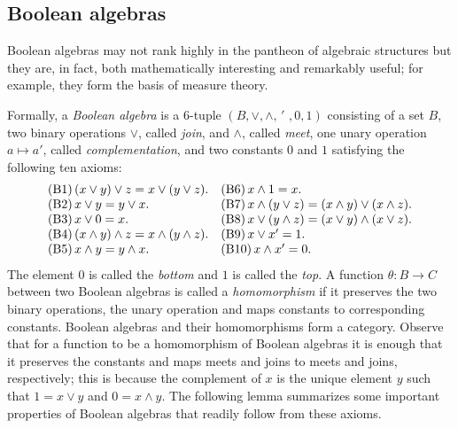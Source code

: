 \documentclass[a4paper]{amsart}
\begin{document}
\subsection{Boolean algebras}
Boolean algebras may not rank highly in the pantheon of algebraic structures but they are, in fact, both mathematically interesting and remarkably useful; for example, 
they form the basis of measure theory.

Formally, a {\em Boolean algebra} is a $6$-tuple 
$(B,\vee,\wedge, \,' \, \, , 0,1)$
consisting of a set $B$, two binary operations $\vee$, called {\em join}, and $\wedge$, called {\em meet},
one unary operation $a \mapsto a'$, called {\em complementation},
and two constants $0$ and $1$
satisfying the following ten axioms:
$$
\begin{array}{ll}

{\rm (B1) }\, (x \vee y) \vee z = x \vee (y \vee z). &{\rm (B6) }\, x \wedge 1 = x.\\

{\rm (B2) }\, x \vee y = y \vee x. &{\rm (B7) }\, x \wedge (y \vee z) = (x \wedge y) \vee (x \wedge z).\\

{\rm (B3) }\, x \vee 0 = x. &{\rm (B8) }\, x \vee (y \wedge z) = (x \vee y) \wedge (x \vee z).\\

{\rm (B4) }\, (x \wedge y) \wedge z = x \wedge (y \wedge z). &{\rm (B9) }\, x \vee x' = 1.\\ 

{\rm (B5) }\, x \wedge y = y \wedge x. &{\rm (B10) }\, x \wedge x' = 0.\\

\end{array}
$$
The element $0$ is called the {\em bottom}  and $1$ is called the {\em top}.
A function $\theta \colon B \rightarrow C$ between two Boolean algebras
is called a {\em homomorphism} if it
preserves the two binary operations, the unary operation and maps constants to corresponding constants.
Boolean algebras and their homomorphisms form a category.
Observe that for a function to be a homomorphism of Boolean algebras it is enough that it preserves the constants
and maps meets and joins to meets and joins, respectively;
this is because the complement of $x$ is the unique element $y$ such that $1 = x \vee y$ and $0 = x \wedge y$.
The following lemma summarizes some important properties of Boolean algebras that readily follow from these axioms.
\end{document}
